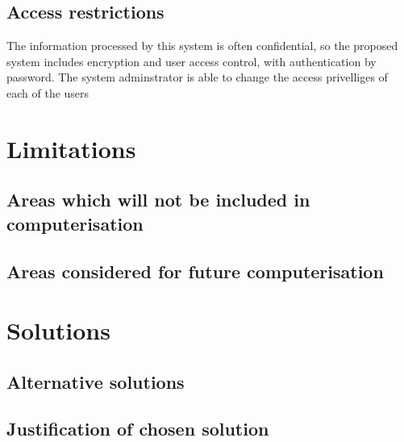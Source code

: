 \subsection{Access restrictions}
	The information processed by this system is often confidential, so the proposed system includes encryption and user access control, with authentication by password. The system adminstrator is able to change the access privelliges of each of the users

\section{Limitations}

\subsection{Areas which will not be included in computerisation}

\subsection{Areas considered for future computerisation}

\section{Solutions}

\subsection{Alternative solutions}

\subsection{Justification of chosen solution}
